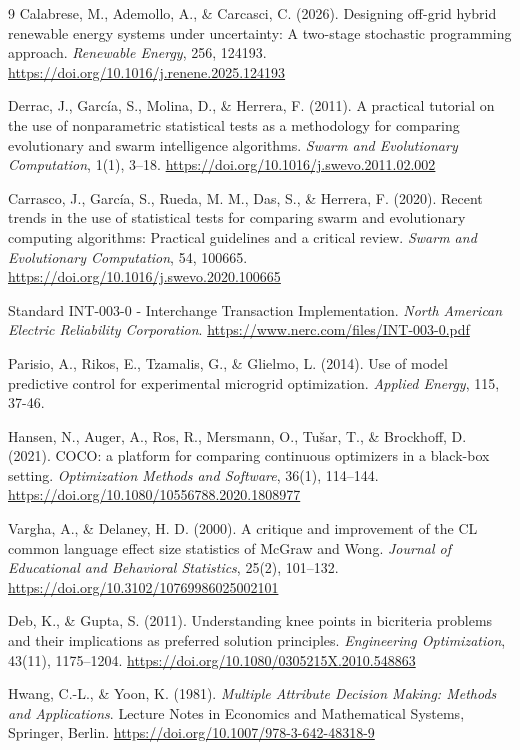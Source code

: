 \documentclass[final,3p,times]{elsarticle}
\begin{document}
\begin{thebibliography}{9}
Calabrese, M., Ademollo, A., \& Carcasci, C. (2026). Designing off-grid hybrid renewable energy systems under uncertainty: A two-stage stochastic programming approach. \textit{Renewable Energy}, 256, 124193. \url{https://doi.org/10.1016/j.renene.2025.124193}

Derrac, J., Garc\'{i}a, S., Molina, D., \& Herrera, F. (2011). A practical tutorial on the use of nonparametric statistical tests as a methodology for comparing evolutionary and swarm intelligence algorithms. \textit{Swarm and Evolutionary Computation}, 1(1), 3--18. \url{https://doi.org/10.1016/j.swevo.2011.02.002}

Carrasco, J., Garc\'{i}a, S., Rueda, M. M., Das, S., \& Herrera, F. (2020). Recent trends in the use of statistical tests for comparing swarm and evolutionary computing algorithms: Practical guidelines and a critical review. \textit{Swarm and Evolutionary Computation}, 54, 100665. \url{https://doi.org/10.1016/j.swevo.2020.100665}

Standard INT-003-0 - Interchange Transaction Implementation. \textit{North American Electric Reliability Corporation}.
\url{https://www.nerc.com/files/INT-003-0.pdf}

Parisio, A., Rikos, E., Tzamalis, G., \& Glielmo, L. (2014). Use of model predictive control for experimental microgrid optimization. \textit{Applied Energy}, 115, 37-46.

Hansen, N., Auger, A., Ros, R., Mersmann, O., Tu\v{s}ar, T., \& Brockhoff, D. (2021). COCO: a platform for comparing continuous optimizers in a black-box setting. \textit{Optimization Methods and Software}, 36(1), 114--144. \url{https://doi.org/10.1080/10556788.2020.1808977}

Vargha, A., \& Delaney, H. D. (2000). A critique and improvement of the CL common language effect size statistics of McGraw and Wong. \textit{Journal of Educational and Behavioral Statistics}, 25(2), 101--132. \url{https://doi.org/10.3102/10769986025002101}

Deb, K., \& Gupta, S. (2011). Understanding knee points in bicriteria problems and their implications as preferred solution principles. \textit{Engineering Optimization}, 43(11), 1175--1204. \url{https://doi.org/10.1080/0305215X.2010.548863}

Hwang, C.-L., \& Yoon, K. (1981). \textit{Multiple Attribute Decision Making: Methods and Applications}. Lecture Notes in Economics and Mathematical Systems, Springer, Berlin. \url{https://doi.org/10.1007/978-3-642-48318-9}


\end{thebibliography}
\end{document}

